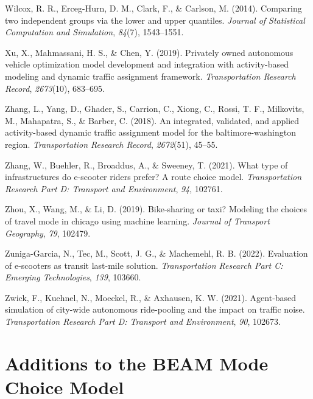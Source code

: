 \documentclass[simple, masters, twoside]{byuthesis}
\newlength{\cslhangindent}
\newlength{\cslentryspacingunit} %
\newenvironment{CSLReferences}[2] %
 {%
  \setlength{\parindent}{0pt}
  \ifodd #1
  \let\oldpar\par
  \def\par{\hangindent=\cslhangindent\oldpar}
  \fi
  \setlength{\parskip}{#2\cslentryspacingunit}
 }%
 {}
\begin{document}
\begin{CSLReferences}{1}{0}
\leavevmode{}%
Wilcox, R. R., Erceg-Hurn, D. M., Clark, F., \& Carlson, M. (2014). Comparing two independent groups via the lower and upper quantiles. \emph{Journal of Statistical Computation and Simulation}, \emph{84}(7), 1543--1551.

\leavevmode{}%
Xu, X., Mahmassani, H. S., \& Chen, Y. (2019). Privately owned autonomous vehicle optimization model development and integration with activity-based modeling and dynamic traffic assignment framework. \emph{Transportation Research Record}, \emph{2673}(10), 683--695.

\leavevmode{}%
Zhang, L., Yang, D., Ghader, S., Carrion, C., Xiong, C., Rossi, T. F., Milkovits, M., Mahapatra, S., \& Barber, C. (2018). An integrated, validated, and applied activity-based dynamic traffic assignment model for the baltimore-washington region. \emph{Transportation Research Record}, \emph{2672}(51), 45--55.

\leavevmode{}%
Zhang, W., Buehler, R., Broaddus, A., \& Sweeney, T. (2021). What type of infrastructures do e-scooter riders prefer? A route choice model. \emph{Transportation Research Part D: Transport and Environment}, \emph{94}, 102761.

\leavevmode{}%
Zhou, X., Wang, M., \& Li, D. (2019). Bike-sharing or taxi? Modeling the choices of travel mode in chicago using machine learning. \emph{Journal of Transport Geography}, \emph{79}, 102479.

\leavevmode{}%
Zuniga-Garcia, N., Tec, M., Scott, J. G., \& Machemehl, R. B. (2022). Evaluation of e-scooters as transit last-mile solution. \emph{Transportation Research Part C: Emerging Technologies}, \emph{139}, 103660.

\leavevmode{}%
Zwick, F., Kuehnel, N., Moeckel, R., \& Axhausen, K. W. (2021). Agent-based simulation of city-wide autonomous ride-pooling and the impact on traffic noise. \emph{Transportation Research Part D: Transport and Environment}, \emph{90}, 102673.

\end{CSLReferences}

\hypertarget{appendix-appendix}{%
\appendix}


\hypertarget{apexA}{%
\chapter{Additions to the BEAM Mode Choice Model}\label{apexA}}
\end{document}
